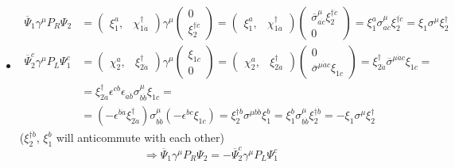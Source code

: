 \documentclass[twoside]{amsart}
\begin{document}
\begin{itemize}
\item[(c)] \[
\begin{aligned}
  \overline{\Psi}_1 \gamma^{\mu} P_R \Psi_2 & = ( \begin{matrix} \xi_1^a, & \chi_{1\dot{a}}^{\dag} \end{matrix}) \gamma^{\mu} \left( \begin{matrix} 0 \\ \xi_{2}^{\dag \dot{c}} \end{matrix} \right) = (\begin{matrix} \xi_1^a, & \chi_{1\dot{a}}^{\dag} \end{matrix} ) \left( \begin{matrix}  \overline{\sigma}^{\mu}_{ a \dot{c}} \xi_2^{\dag \dot{c}} \\ 0 \end{matrix} \right) = \xi_1^a \sigma^{\mu}_{a\dot{c}} \xi_2^{\dag \dot{c}} = \xi_1 \sigma^{\mu} \xi_2^{\dag} \\ 
  \overline{\Psi}_2^c \gamma^{\mu} P_L \Psi_1^c & = ( \begin{matrix} \chi_2^a, & \xi_{2\dot{a}}^{\dag} \end{matrix}) \gamma^{\mu} \left( \begin{matrix}  \xi_{1c} \\ 0  \end{matrix} \right) = (\begin{matrix} \chi_2^a, & \xi_{2\dot{a}}^{\dag} \end{matrix} ) \left( \begin{matrix} 0 \\ \overline{\sigma}^{\mu \dot{a} c} \xi_{1c} \end{matrix} \right) = \xi_{2\dot{a}}^{\dag} \overline{\sigma}^{\mu \dot{a}c} \xi_{1c} = \\
    & = \xi_{2\dot{a}}^{\dag} \epsilon^{cb} \epsilon_{\dot{a}\dot{b}} \sigma^{\mu}_{b\dot{b}} \xi_{1c}   = \\
    & = (-\epsilon^{\dot{b} \dot{a}} \xi_{2\dot{a}}^{\dag})\sigma^{\mu}_{b\dot{b}} (- \epsilon^{bc} \xi_{1c} ) = \xi_{2}^{\dag \dot{b}} \sigma^{\mu b\dot{b}} \xi_1^b = \xi_1^b \sigma^{\mu}_{b\dot{b}} \xi_2^{\dag \dot{b}} = -\xi_1 \sigma^{\mu} \xi_2^{\dag}
\end{aligned}
\]
($\xi_2^{\dag \dot{b}}$, $\xi_1^b$ will anticommute with each other)
\[
\Longrightarrow \boxed{ \overline{\Psi}_1 \gamma^{\mu} P_R \Psi_2 = - \overline{\Psi}_2^c \gamma^{\mu} P_L \Psi_1^c }
\]



\end{itemize}
\end{document}
